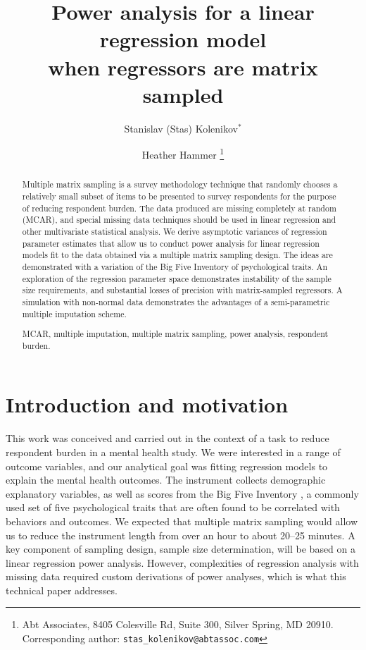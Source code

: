 \documentclass[11pt]{asaproc}
\begin{document}
\title{Power analysis for a linear regression model \\ when regressors are matrix sampled}
\author{Stanislav (Stas) Kolenikov$^*$ \and Heather Hammer%
\thanks{Abt Associates, 8405 Colesville Rd, Suite 300, Silver Spring, MD 20910. Corresponding author: \texttt{stas\_kolenikov@abtassoc.com}}}
\maketitle

\begin{abstract}%
Multiple matrix sampling is a survey methodology technique that randomly chooses a relatively small subset of items
to be presented to survey respondents for the purpose of reducing respondent burden. The data produced are missing
completely at random (MCAR), and special missing data techniques should be used in 
linear regression and other multivariate statistical analysis. 
We derive asymptotic variances of regression parameter estimates that allow us to conduct
power analysis for linear regression models fit to the data obtained via a multiple matrix sampling design.
The ideas are demonstrated with a variation of the Big Five Inventory of psychological traits.
An exploration of the regression parameter space
demonstrates instability of the sample size requirements, and substantial losses of precision with matrix-sampled
regressors. A simulation with non-normal data demonstrates the advantages of a semi-parametric multiple imputation
scheme.

\begin{keywords}
MCAR, multiple imputation, multiple matrix sampling, power analysis, respondent burden.
\end{keywords}
\end{abstract}


\section{Introduction and motivation}

This work was conceived and carried out in the context of a task to reduce 
respondent burden in a mental health study. We were interested in a range of outcome
variables, and our analytical goal was fitting regression models to explain the mental health outcomes.
The instrument collects demographic explanatory variables,
as well as scores from the Big Five Inventory \citep{john:sriv:1999:big5},
a commonly used set of five psychological traits that are often found to be correlated
with behaviors and outcomes. We expected that multiple matrix sampling would allow
us to reduce the instrument length from over an hour to about 20--25 minutes.
A key component of sampling design, sample size determination,
will be based on a linear regression power analysis.
However, complexities of regression analysis with missing data required custom
derivations of power analyses, which is what this technical paper addresses.
\end{document}

